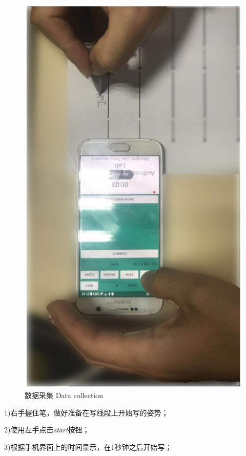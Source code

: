 \begin{figure}[!htp]
\begin{minipage}[t]{0.32\textwidth}
    \centering
    \includegraphics[width=\textwidth]{figure/app-data-collection.pdf}
    \bicaption
    {数据采集}
    {Data collection}
    \label{fig:data-collection}
   \end{minipage}
\end{figure}

1)右手握住笔，做好准备在写线段上开始写的姿势；

2)使用左手点击\textit{start}按钮；

3)根据手机界面上的时间显示，在1秒钟之后开始写；

